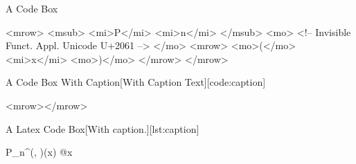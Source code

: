 \begin{codebox}{A Code Box}
\begin{code}[MathML]
<mrow>
  <msub>
    <mi>P</mi>
    <mi>n</mi>
  </msub>
  <mo>
    <!-- Invisible 
    Funct. Appl. 
    Unicode U+2061 -->  
  </mo>
  <mrow>
    <mo>(</mo>
    <mi>x</mi>
    <mo>)</mo>
  </mrow>
</mrow>
\end{code}
\end{codebox}

\begin{codebox}{A Code Box With Caption}[With Caption Text][code:caption]
\begin{code}[MathML]
<mrow></mrow>
\end{code}
\end{codebox}

\begin{codebox}{A Latex Code Box}[With caption.][lst:caption]
\begin{code}[mytex]
P_n^{(\alpha , \beta)}(x)          %
@{x} %
\end{code}
\end{codebox}
